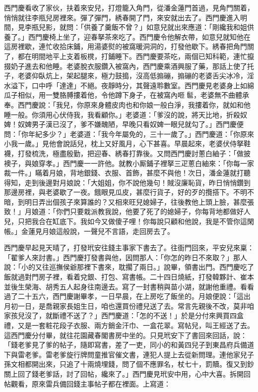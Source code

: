 西門慶看收了家伙，扶着來安兒，打燈籠入角門，從潘金蓮門首過，見角門關着，悄悄就往李瓶兒房裡來。彈了彈門，{}綉春開了門，來安就出去了。西門慶進入明間，見李瓶兒影，就問：「供養了羹飯不曾？」如意兒就出來應道：「剛纔我和姐供養了。」西門慶椅上坐了，迎春拏茶來吃了。西門慶令他解衣帶，如意兒就知他在這房裡歇，連忙收拾床鋪，用湯婆熨的被窩暖洞洞的，打發他歇下。綉春把角門關了，都在明間地平上支着板櫈，打鋪睡下。西門慶要茶吃，兩個已知科範，連忙攛掇奶子進去和他睡。老婆脫衣服鑽入被窩內，西門慶乘酒興服了藥，那話上使了托子，老婆仰臥炕上，架起腿來，極力鼓搗，沒高低搧磞，搧磞的老婆舌尖冰冷，淫水溢下，口中呼「達達」不絕。夜靜時分，其聲遠聆數室。{}西門慶見老婆身上如綿瓜子相似，用一雙胳膊摟着他，令他蹲下身子，在被窩內咂𩫻䯲，老婆無不曲體承奉。西門慶說：「我兒，你原來身體皮肉也和你娘一般白淨，我摟着你，就如和他睡一般。{}你須用心伏侍我，我看顧你。」老婆道：「爹沒的說，將天比地，折殺奴婢！奴婢男子漢已沒了，爹不嫌醜陋，早晚只看奴婢一眼兒就勾了。」西門慶便問：「你年紀多少？」老婆道：「我今年屬免的，三十一歲了。」西門慶道：「你原來小我一歲。」見他會說話兒，枕上又好風月，心下甚喜。早晨起來，老婆伏侍拏鞋襪，打發梳洗，極盡殷勤，把迎春、綉春打靠後。又問西門慶討蔥白紬子：「做披襖子，與娘穿孝。」西門慶一一許他。就教小厮鋪子裡拏三疋蔥白紬來：「你每一家裁一件。」瞞着月娘，背地銀錢、衣服、首飾，甚麼不與他！次日，潘金蓮就打聽得知，走到後邊對月娘說：「大姐姐，你不說他幾句！賊沒廉恥貨，昨日悄悄鑽到那邊房裡，與老婆歇了一夜。餓眼見瓜皮，甚麼行貨子，好的歹的攬搭下。不明不暗，到明日弄出個孩子來算誰的？又相來旺兒媳婦子，往後教他上頭上臉，甚麼張致！」月娘道：「你們只要栽派教我說，他要了死了的媳婦子，你每背地都做好人兒，只把我合在缸底下。我如今又做傻子哩！你每說只顧和他說，我是不管你這閑帳。」金蓮見月娘這般說，一聲兒不言語，走回房去了。

西門慶早起見天晴了，打發玳安往錢主事家下書去了。往衙門回來，平安兒來稟：「翟爹人來討書。」西門慶打發書與他，因問那人：「你怎的昨日不來取？」那人說：「小的又往巡撫侯爺那裡下書來，{}耽擱了兩日。」說畢，領書出門。西門慶吃了飯就過對門房子裡，看着兌銀、打包、寫書帳。二十四日燒紙，打發韓夥計、崔本並後生榮海、胡秀五人起身往南邊去。寫了一封書稍與苗小湖，就謝他重禮。看看過了二十五六，西門慶謝畢孝，一日早晨，在上房吃了飯坐的。月娘便說：「這出月初一日，是喬親家長姐生日，咱也還買份禮兒送了去。常言先親後不改，莫非咱家孩兒沒了，就斷禮不送了？」西門慶道：「怎的不送！」於是分付來興買四盒禮，又是一套粧花段子衣服、兩方銷金汗巾、一盒花翠。寫帖兒，叫王經送了去。這西門慶分付畢，就往花園藏春閣書房中坐的。只見玳安下了書回來回話，說：「錢老爹見了爹的帖子，隨即寫書，差了一吏，同小的和黃四兒子到東昌府兵備道下與雷老爹。雷老爹旋行牌問童推官催文書，連犯人提上去從新問理。連他家兒子孫文相都開出來，只追了十兩燒埋錢，問了個不應罪名，杖七十，罰贖。復又到鈔關上回了錢老爹話，討了回帖，纔來了。」西門慶見玳安中用，心中大喜。拆開回帖觀看，原來雷兵備回錢主事帖子都在裡面。上寫道：

